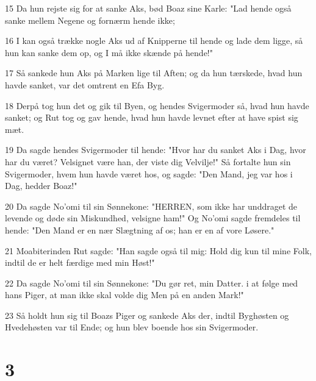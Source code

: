 \par 15 Da hun rejste sig for at sanke Aks, bød Boaz sine Karle: "Lad hende også sanke mellem Negene og fornærm hende ikke;
\par 16 I kan også trække nogle Aks ud af Knipperne til hende og lade dem ligge, så hun kan sanke dem op, og I må ikke skænde på hende!"
\par 17 Så sankede hun Aks på Marken lige til Aften; og da hun tærskede, hvad hun havde sanket, var det omtrent en Efa Byg.
\par 18 Derpå tog hun det og gik til Byen, og hendes Svigermoder så, hvad hun havde sanket; og Rut tog og gav hende, hvad hun havde levnet efter at have spist sig mæt.
\par 19 Da sagde hendes Svigermoder til hende: "Hvor har du sanket Aks i Dag, hvor har du været? Velsignet være han, der viste dig Velvilje!" Så fortalte hun sin Svigermoder, hvem hun havde været hos, og sagde: "Den Mand, jeg var hos i Dag, hedder Boaz!"
\par 20 Da sagde No'omi til sin Sønnekone: "HERREN, som ikke har unddraget de levende og døde sin Miskundhed, velsigne ham!" Og No'omi sagde fremdeles til hende: "Den Mand er en nær Slægtning af os; han er en af vore Løsere."
\par 21 Moabiterinden Rut sagde: "Han sagde også til mig: Hold dig kun til mine Folk, indtil de er helt færdige med min Høst!"
\par 22 Da sagde No'omi til sin Sønnekone: "Du gør ret, min Datter. i at følge med hans Piger, at man ikke skal volde dig Men på en anden Mark!"
\par 23 Så holdt hun sig til Boazs Piger og sankede Aks der, indtil Byghøsten og Hvedehøsten var til Ende; og hun blev boende hos sin Svigermoder.

\chapter{3}

